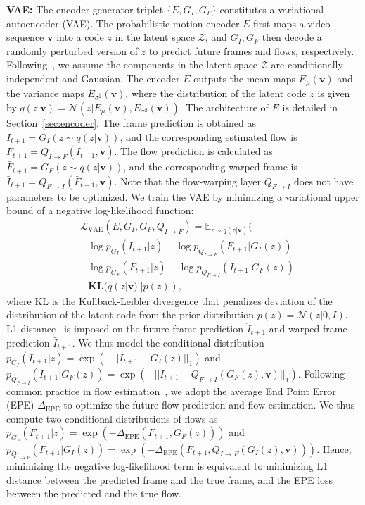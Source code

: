 \documentclass[10pt,twocolumn,letterpaper]{article}
\begin{document}
	\textbf{VAE:} The encoder-generator triplet $\{E, G_I, G_F\}$ constitutes a variational autoencoder (VAE). The probabilistic motion encoder $E$ first maps a video sequence $\mathbf{v}$ into a code $z$ in the latent space $\mathcal{Z}$, and $G_I,G_F$ then decode a randomly perturbed version of $z$ to predict future frames and flows, respectively. Following~\cite{kingma2013auto}, we assume the components in the latent space $\mathcal{Z}$ are conditionally independent and Gaussian. The encoder $E$ outputs the mean maps $E_\mu(\mathbf{v})$ and the variance maps $E_{\sigma^2}(\mathbf{v})$, where the distribution of the latent code $z$ is given by $q(z|\mathbf{v}) = \mathcal{N}(z|E_\mu(\mathbf{v}), E_{\sigma^2}(\mathbf{v}))$. The architecture of $E$ is detailed in Section~\ref{sec:encoder}. The frame prediction is obtained as $\ddot{I}_{t+1} = G_I(z\sim q(z|\mathbf{v}))$, and the corresponding estimated flow is $\ddot{F}_{t+1} = Q_{I\rightarrow F}(\ddot{I}_{t+1},\mathbf{v})$. The flow prediction is calculated as $\bar{F}_{t+1} = G_F(z\sim q(z|\mathbf{v}))$, and the corresponding warped frame is $\bar{I}_{t+1} = Q_{F\rightarrow I}(\bar{F}_{t+1},\mathbf{v})$.  Note that the flow-warping layer $Q_{F\rightarrow I}$ does not have parameters to be optimized. We train the VAE by minimizing a variational upper bound of a negative log-likelihood function:
	\begin{equation}
	\begin{split}
	&\mathcal{L}_{\text{VAE}}(E, G_I, G_F, Q_{I\rightarrow F})=\mathbb{E}_{z\sim q(z|\mathbf{v})}(\\
	&-\log p_{G_I}(I_{t+1}|z) -\log p_{Q_{I\rightarrow F}}(F_{t+1}|G_I(z))\\
	&-\log p_{G_F}(F_{t+1}|z) -\log p_{Q_{F\rightarrow I}}(I_{t+1}|G_F(z))\\
	&+ \mathbf{KL}(q(z|\mathbf{v})||p(z)),
	\label{VAE}
	\end{split}
	\end{equation}
	where KL is the Kullback-Leibler divergence that penalizes deviation of the distribution of the latent code from the prior distribution $p(z) = \mathcal{N}(z|0, I)$. L1 distance~\cite{lotter2016deep,liu2017video} is imposed on the future-frame prediction $\ddot{I}_{t+1}$ and warped frame prediction $\bar{I}_{t+1}$. We thus model the conditional distribution $p_{G_I}(I_{t+1}|z) = \exp(-||I_{t+1}-G_I(z)||_1)$ and $p_{Q_{F\rightarrow I}}(I_{t+1}|G_F(z)) =  \exp(-||I_{t+1}-Q_{F\rightarrow I}(G_F(z),\mathbf{v})||_1)$. Following common practice in flow estimation~\cite{ranjan2016optical}, we adopt the average End Point Error (EPE) $\Delta_{\text{EPE}}$ to optimize the future-flow prediction and flow estimation. We thus compute two conditional distributions of flows as $p_{G_F}(F_{t+1}|z) = \exp(-\Delta_{\text{EPE}}(F_{t+1}, G_F(z)))$ and $p_{Q_{I\rightarrow F}}(F_{t+1}|G_I(z)) = \exp(-\Delta_{\text{EPE}}(F_{t+1}, Q_{I\rightarrow F}(G_I(z),\mathbf{v})))$. Hence, minimizing the negative log-likelihood term is equivalent to minimizing L1 distance between the predicted frame and the true frame, and the EPE loss between the predicted and the true flow.
\end{document}
